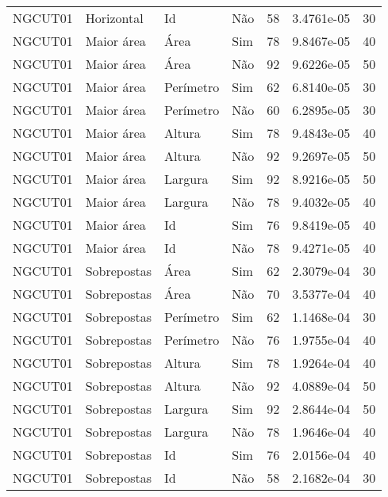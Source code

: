 \begin{tabular}{llllrrr}
NGCUT01   & Horizontal  & Id        & Não         & 58           & 3.4761e-05 & 30       \\
NGCUT01   & Maior área  & Área      & Sim         & 78           & 9.8467e-05 & 40       \\
NGCUT01   & Maior área  & Área      & Não         & 92           & 9.6226e-05 & 50       \\
NGCUT01   & Maior área  & Perímetro & Sim         & 62           & 6.8140e-05 & 30       \\
NGCUT01   & Maior área  & Perímetro & Não         & 60           & 6.2895e-05 & 30       \\
NGCUT01   & Maior área  & Altura    & Sim         & 78           & 9.4843e-05 & 40       \\
NGCUT01   & Maior área  & Altura    & Não         & 92           & 9.2697e-05 & 50       \\
NGCUT01   & Maior área  & Largura   & Sim         & 92           & 8.9216e-05 & 50       \\
NGCUT01   & Maior área  & Largura   & Não         & 78           & 9.4032e-05 & 40       \\
NGCUT01   & Maior área  & Id        & Sim         & 76           & 9.8419e-05 & 40       \\
NGCUT01   & Maior área  & Id        & Não         & 78           & 9.4271e-05 & 40       \\
NGCUT01   & Sobrepostas & Área      & Sim         & 62           & 2.3079e-04 & 30       \\
NGCUT01   & Sobrepostas & Área      & Não         & 70           & 3.5377e-04 & 40       \\
NGCUT01   & Sobrepostas & Perímetro & Sim         & 62           & 1.1468e-04 & 30       \\
NGCUT01   & Sobrepostas & Perímetro & Não         & 76           & 1.9755e-04 & 40       \\
NGCUT01   & Sobrepostas & Altura    & Sim         & 78           & 1.9264e-04 & 40       \\
NGCUT01   & Sobrepostas & Altura    & Não         & 92           & 4.0889e-04 & 50       \\
NGCUT01   & Sobrepostas & Largura   & Sim         & 92           & 2.8644e-04 & 50       \\
NGCUT01   & Sobrepostas & Largura   & Não         & 78           & 1.9646e-04 & 40       \\
NGCUT01   & Sobrepostas & Id        & Sim         & 76           & 2.0156e-04 & 40       \\
NGCUT01   & Sobrepostas & Id        & Não         & 58           & 2.1682e-04 & 30       \\
\hline
\end{tabular}